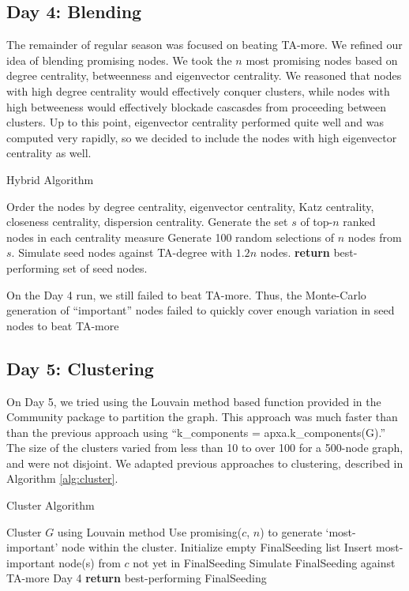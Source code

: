 \documentclass[letterpaper, 11pt]{article}
\begin{document}
\subsection{Day 4: Blending}
The remainder of regular season was focused on beating TA-more. We refined our idea of blending promising nodes. We took the $n$ most promising nodes based on degree centrality, betweenness and eigenvector centrality. We reasoned that nodes with high degree centrality would effectively conquer clusters, while nodes with high betweeness would effectively blockade cascasdes from proceeding between clusters. Up to this point, eigenvector centrality performed quite well and was computed very rapidly, so we decided to include the nodes with high eigenvector centrality as well.

\begin{algorithm}
\caption{Hybrid Algorithm}
\begin{algorithmic}[1]
\State Order the nodes by degree centrality, eigenvector centrality, Katz centrality, closeness centrality, dispersion centrality.
\State Generate the set $s$ of top-$n$ ranked nodes in each centrality measure
\State Generate 100 random selections of $n$ nodes from $s$.
\State Simulate seed nodes against TA-degree with $1.2n$ nodes.
\EndFor
\State \textbf{return} best-performing set of seed nodes.
\EndProcedure
\end{algorithmic}
\label{alg:hybrid}
\end{algorithm}

On the Day 4 run, we still failed to beat TA-more. Thus, the Monte-Carlo generation of ``important'' nodes failed to quickly cover enough variation in seed nodes to beat TA-more

\subsection{Day 5: Clustering}
On Day 5, we tried using the Louvain method \cite{louvain} based function provided in the Community package to partition the graph. This approach was much faster than than the previous approach using ``k\_components = apxa.k\_components(G).'' The size of the clusters varied from less than 10 to over 100 for a 500-node graph, and were not disjoint. We adapted previous approaches to clustering, described in Algorithm \ref{alg:cluster}.

\begin{algorithm}
\caption{Cluster Algorithm}
\begin{algorithmic}[1]
\State Cluster $G$ using Louvain method
\State Use promising($c$, $n$) to generate `most-important' node within the cluster.
\EndFor
{}
\State Initialize empty FinalSeeding list
\State Insert most-important node(s) from $c$ not yet in FinalSeeding
\EndFor
\State Simulate FinalSeeding against TA-more Day 4
\EndWhile
\EndFor
\State \textbf{return} best-performing FinalSeeding
\EndProcedure
\end{algorithmic}
\label{alg:cluster}
\end{algorithm}
\end{document}
